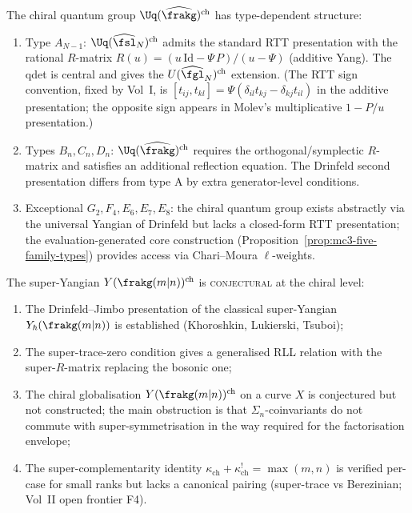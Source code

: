 \begin{remark}
\label{rem:qg-type-a-vs-bcd}
The chiral quantum group $\Uq(\widehat{\frakg})^{\mathrm{ch}}$
has type-dependent structure:
\begin{enumerate}[label=(\alph*)]
 \item Type $A_{N-1}$: $\Uq(\widehat{\fsl}_N)^{\mathrm{ch}}$
 admits the standard RTT presentation with the rational
 $R$-matrix
 $R(u) = (u\,\mathrm{Id} - \Psi\,P)/(u - \Psi)$
 (additive Yang). The qdet is central and gives the
 $U(\widehat{\fgl}_N)^{\mathrm{ch}}$ extension.
 (The RTT sign convention, fixed by Vol~I, is
 $[t_{ij}, t_{kl}] = \Psi(\delta_{il} t_{kj} - \delta_{kj} t_{il})$
 in the additive presentation; the opposite sign appears in Molev's
 multiplicative $1 - P/u$ presentation.)
 \item Types $B_n, C_n, D_n$: $\Uq(\widehat{\frakg})^{\mathrm{ch}}$
 requires the orthogonal/symplectic $R$-matrix and
 satisfies an additional reflection equation. The Drinfeld
 second presentation differs from type A by extra
 generator-level conditions.
 \item Exceptional $G_2, F_4, E_6, E_7, E_8$: the chiral
 quantum group exists abstractly via the universal Yangian
 of Drinfeld but lacks a closed-form RTT presentation; the
 evaluation-generated core construction
 (Proposition~\ref{prop:mc3-five-family-types}) provides
 access via Chari--Moura $\ell$-weights.
\end{enumerate}
\end{remark}

\begin{remark}
\label{rem:super-yangian-scope}
The super-Yangian $Y(\frakg(m|n))^{\mathrm{ch}}$ is
\textsc{conjectural} at the chiral level:
\begin{enumerate}[label=(\alph*)]
 \item The Drinfeld--Jimbo presentation of the classical
 super-Yangian $Y_\hbar(\frakg(m|n))$ is established
 (Khoroshkin, Lukierski, Tsuboi);
 \item The super-trace-zero condition gives a generalised
 RLL relation with the super-$R$-matrix replacing the bosonic
 one;
 \item The chiral globalisation $Y(\frakg(m|n))^{\mathrm{ch}}$
 on a curve $X$ is conjectured but not constructed; the
 main obstruction is that $\Sigma_n$-coinvariants do not
 commute with super-symmetrisation in the way required for
 the factorisation envelope;
 \item The super-complementarity identity
 $\kappa_{\mathrm{ch}} + \kappa_{\mathrm{ch}}^! = \max(m, n)$ is verified per-case for
 small ranks but lacks a canonical pairing
 (super-trace vs Berezinian; Vol~II open frontier F4).
\end{enumerate}
\end{remark}


